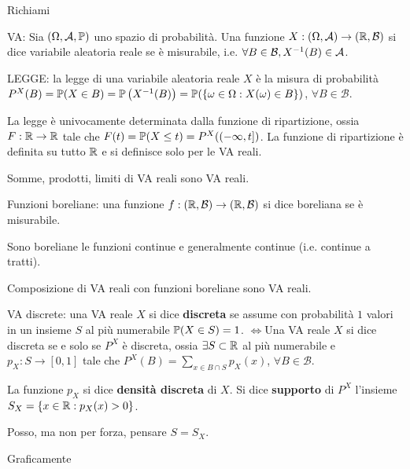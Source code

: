 
\ParteEsercizi

Richiami

VA: Sia $(\Omega,\mathcal{A},\mathbb{P})$ uno spazio di probabilità. Una funzione $X:(\Omega ,\mathcal{A})\rightarrow (\mathbb{R} ,\mathcal{B})$ si dice variabile aleatoria reale se è misurabile, i.e. $\forall B\in \mathcal{B} ,X^{-1}(B) \in \mathcal{A}$.

LEGGE: la legge di una variabile aleatoria reale $X$ è la misura di probabilità $P^{X}(B) =\mathbb{P}(X\in B) =\mathbb{P}\left(X^{-1}(B)\right) =\mathbb{P}(\{\omega \in \Omega :X(\omega) \in B\})$, $\forall B\in \mathcal{B}$.
\begin{oss}
	La legge è univocamente determinata dalla funzione di ripartizione, ossia $F:\mathbb{R}\rightarrow \mathbb{R}$ tale che $F(t) =\mathbb{P}(X\leq t) =P^{X}((-\infty ,t])$. La funzione di ripartizione è definita su tutto $\mathbb{R}$ e si definisce solo per le VA reali.
\end{oss}
\begin{oss}
Somme, prodotti, limiti di VA reali sono VA reali.
\end{oss}
Funzioni boreliane: una funzione $f:(\mathbb{R} ,\mathcal{B})\rightarrow (\mathbb{R} ,\mathcal{B})$ si dice boreliana se è misurabile.
\begin{oss}
Sono boreliane le funzioni continue e generalmente continue (i.e. continue a tratti).
\end{oss}
\begin{oss}
Composizione di VA reali con funzioni boreliane sono VA reali.
\end{oss}
VA discrete: una VA reale $X$ si dice \textbf{discreta} se assume con probabilità $1$ valori in un insieme $S$ al più numerabile $\mathbb{P}(X\in S) =1$. $\iff $Una VA reale $X$ si dice discreta se e solo se $P^{X}$ è discreta, ossia $\exists S\subset \mathbb{R}$ al più numerabile e $p_{X} :S\rightarrow [0,1]$ tale che $P^{X}(B) =\sum\limits_{x\in B\cap S} p_{X}(x)$, $\forall B\in \mathcal{B}$.

La funzione $p_{X}$ si dice \textbf{densità discreta} di $X$. Si dice \textbf{supporto} di $P^{X}$ l'insieme $S_{X} =\{x\in \mathbb{R} :p_{X}(x)  >0\}$.
\begin{oss}
Posso, ma non per forza, pensare $S=S_{X}$.
\end{oss}
Graficamente




